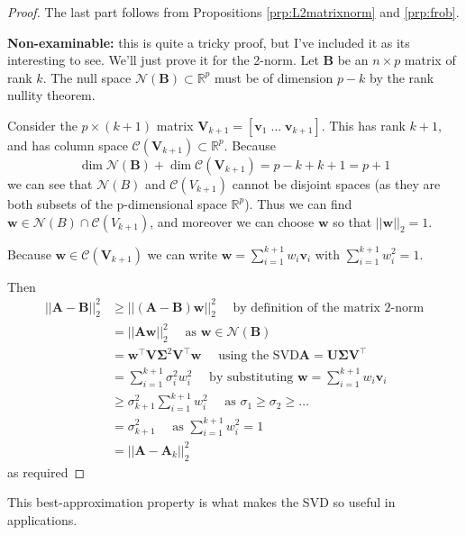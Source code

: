 \documentclass[
]{book}
\theoremstyle{definition}
\theoremstyle{definition}
\theoremstyle{definition}
\theoremstyle{definition}
\theoremstyle{remark}
\begin{document}
\begin{proof}
The last part follows from Propositions \ref{prp:L2matrixnorm} and \ref{prp:frob}.

\textbf{Non-examinable:} this is quite a tricky proof, but I've included it as its interesting to see.
We'll just prove it for the 2-norm.
Let \(\mathbf B\) be an \(n\times p\) matrix of rank \(k\). The null space \(\mathcal{N}(\mathbf B)\subset\mathbb{R}^p\) must be of dimension \(p-k\) by the rank nullity theorem.

Consider the \(p \times (k+1)\) matrix \(\mathbf V_{k+1}=[\mathbf v_1\; \ldots \;\mathbf v_{k+1}]\). This has rank \(k+1\), and has column space \(\mathcal{C}(\mathbf V_{k+1})\subset \mathbb{R}^{p}\). Because
\[\dim \mathcal{N}(\mathbf B)+\dim \mathcal{C}(\mathbf V_{k+1})=p-k+k+1=p+1\]
we can see that \(\mathcal{N}(B)\) and \(\mathcal{C}(V_{k+1})\) cannot be disjoint spaces (as they are both subsets of the p-dimensional space \(\mathbb{R}^p\)). Thus we can find
\(\mathbf w\in \mathcal{N}(B)\cap\mathcal{C}(V_{k+1})\), and moreover we can choose \(\mathbf w\) so that \(||\mathbf w||_2=1\).

Because \(\mathbf w\in \mathcal{C}(\mathbf V_{k+1})\) we can write \(\mathbf w= \sum_{i=1}^{k+1}w_i \mathbf v_i\) with \(\sum_{i=1}^{k+1}w_i^2=1\).

Then
\begin{align*}
||\mathbf A-\mathbf B||_2^2 &\geq ||(\mathbf A-\mathbf B)\mathbf w||_{2}^2 \quad \mbox{ by definition of the matrix 2-norm}\\
&=||\mathbf A\mathbf w||_2^2 \quad \mbox{ as } \mathbf w\in \mathcal{N}(\mathbf B)\\
&=\mathbf w^\top \mathbf V\boldsymbol{\Sigma}^2\mathbf V^\top \mathbf w\quad\mbox{ using the SVD} \mathbf A=\mathbf U\boldsymbol{\Sigma}\mathbf V^\top\\
&=\sum_{i=1}^{k+1}\sigma_i^2 w_i^2 \quad\mbox{ by substituting }\mathbf w= \sum_{i=1}^{k+1}w_i \mathbf v_i\\
&\geq \sigma_{k+1}^2 \sum_{i=1}^{k+1} w_i^2\quad\mbox{ as } \sigma_1\geq\sigma_2\geq\ldots\\
&= \sigma_{k+1}^2 \quad\mbox{ as } \sum_{i=1}^{k+1}w_i^2=1\\
&=||\mathbf A-\mathbf A_k||_2^2
\end{align*}
as required
\end{proof}

This best-approximation property is what makes the SVD so useful in applications.
\end{document}
